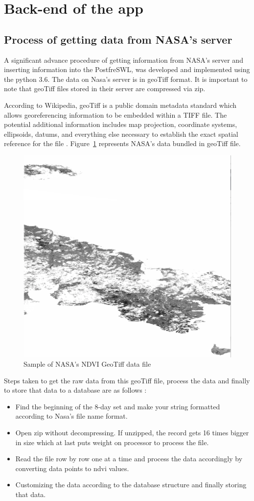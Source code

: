 \section{Back-end of the app}

\subsection{Process of getting data from NASA's server}

A significant advance procedure of getting information from NASA's server and inserting information into the PostfreSWL, was developed and implemented using the python 3.6. The data on Nasa's server is in \gls{geoTiff} format. It is important to note that \gls{geoTiff} files stored in their server are compressed via zip.


According to Wikipedia, \gls{geoTiff} is a public domain metadata standard which allows georeferencing information to be embedded within a TIFF file. The potential additional information includes map projection, coordinate systems, ellipsoids, datums, and everything else necessary to establish the exact spatial reference for the file \cite{GeoTIFF_Wikipedia}. Figure~\ref{fig:geotiff} represents NASA's data bundled in \gls{geoTiff} file.

    \begin{figure}[H]
            \centering
            \includegraphics[width=0.35\linewidth]{figures/ch4/geotiff.png}
            \caption{\label{fig:geotiff} Sample of NASA's NDVI GeoTiff data file}
    \end{figure}

    Steps taken to get the raw data from this \gls{geoTiff} file, process the data and finally to store that data to a database are as follows :
    
    \begin{itemize}
        \item Find the beginning of the 8-day set and make your string formatted according to Nasa's file name format.
        
        \item Open zip without decompressing. If unzipped, the record gets 16 times bigger in size which at last puts weight on processor to process the file.
        
        \item Read the file row by row one at a time and process the data accordingly by converting data points to \gls{ndvi} values.
        
        \item Customizing the data according to the database structure and finally storing that data.
    \end{itemize}

